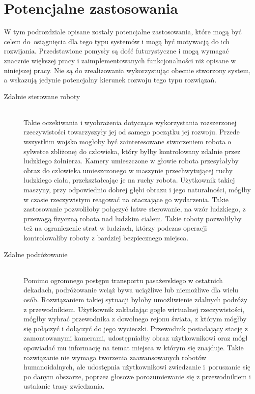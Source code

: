 \documentclass[a4paper,11pt,twoside]{report}
\theoremstyle{definition}
\begin{document}
\section{Potencjalne zastosowania}

W tym podrozdziale opisane zostały potencjalne zastosowania, które mogą być celem do~osiągnięcia dla tego typu systemów i mogą być motywacją do ich rozwijania. Przedstawione pomysły są dość futurystyczne i mogą wymagać znacznie większej pracy i zaimplementowanych funkcjonalności niż opisane w niniejszej pracy. Nie są do zrealizowania wykorzystując obecnie stworzony system, a wskazują jedynie potencjalny kierunek rozwoju tego typu rozwiązań.

\begin{description}
\item [Zdalnie sterowane roboty] \hfill \\
Takie oczekiwania i wyobrażenia dotyczące wykorzystania rozszerzonej rzeczywistości towarzyszyły jej od samego początku jej rozwoju. Przede wszystkim wojsko mogłoby być zainteresowane stworzeniem robota o sylwetce zbliżonej do człowieka, który byłby kontrolowany zdalnie przez ludzkiego żołnierza. Kamery umieszczone w głowie robota przesyłałyby obraz do człowieka umieszczonego w maszynie przechwytującej ruchy ludzkiego ciała, przekształcając je na ruchy robota. Użytkownik takiej maszyny, przy odpowiednio dobrej głębi obrazu i jego naturalności, mógłby w czasie rzeczywistym reagować na otaczające go wydarzenia. Takie zastosowanie pozwoliłoby połączyć łatwe sterowanie, na wzór ludzkiego, z przewagą fizyczną robota nad ludzkim ciałem. Takie roboty pozwoliłyby też na ograniczenie strat w ludziach, którzy podczas operacji kontrolowaliby roboty z bardziej bezpiecznego miejsca.
  
\item [Zdalne podróżowanie] \hfill \\
Pomimo ogromnego postępu transportu pasażerskiego w ostatnich dekadach, podróżowanie wciąż bywa uciążliwe lub niemożliwe dla wielu osób. Rozwiązaniem takiej sytuacji byłoby umożliwienie zdalnych podróży z przewodnikiem. Użytkownik zakładając gogle wirtualnej rzeczywistości, mógłby wybrać przewodnika z dowolnego rejonu świata, z którym mógłby się połączyć i dołączyć do jego wycieczki. Przewodnik posiadający stację z zamontowanymi kamerami, udostępniałby obraz użytkownikowi oraz mógł opowiadać mu informację na temat miejsca w którym się znajduje. Takie rozwiązanie nie wymaga tworzenia zaawansowanych robotów humanoidalnych, ale udostępnia użytkownikowi zwiedzanie i~poruszanie się po danym obszarze, poprzez głosowe porozumiewanie się z przewodnikiem i ustalanie trasy zwiedzania.
\end{description}
\end{document}
